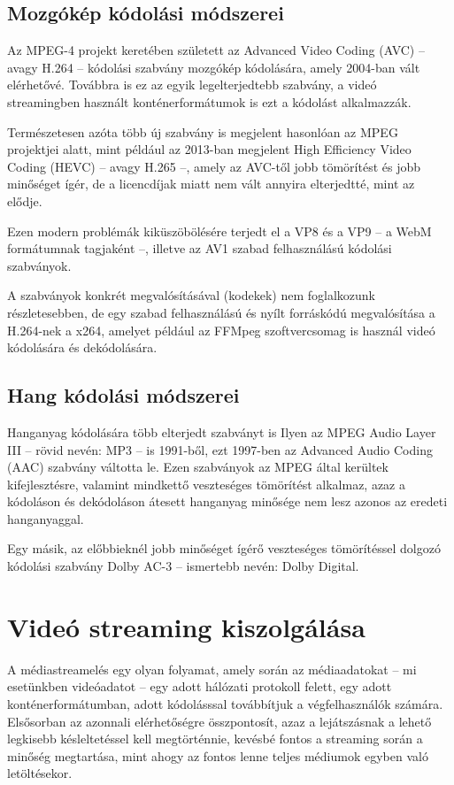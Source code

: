 \subsection{Mozgókép kódolási módszerei}

Az MPEG-4 projekt keretében született az Advanced Video Coding (AVC) -- avagy H.264 -- kódolási szabvány mozgókép kódolására, amely 2004-ban vált elérhetővé. Továbbra is ez az egyik legelterjedtebb szabvány, a videó streamingben használt konténerformátumok is ezt a kódolást alkalmazzák.

Természetesen azóta több új szabvány is megjelent hasonlóan az MPEG projektjei alatt, mint például az 2013-ban megjelent High Efficiency Video Coding (HEVC) -- avagy H.265 --, amely az AVC-től jobb tömörítést és jobb minőséget ígér, de a licencdíjak miatt nem vált annyira elterjedtté, mint az elődje.

Ezen modern problémák kiküszöbölésére terjedt el a VP8 és a VP9 -- a WebM formátumnak tagjaként --, illetve az AV1 szabad felhasználású kódolási szabványok.

A szabványok konkrét megvalósításával (kodekek) nem foglalkozunk részletesebben, de egy szabad felhasználású és nyílt forráskódú megvalósítása a H.264-nek a x264, amelyet például az FFMpeg szoftvercsomag is használ videó kódolására és dekódolására.

\subsection{Hang kódolási módszerei}

Hanganyag kódolására több elterjedt szabványt is Ilyen az MPEG Audio Layer III -- rövid nevén: MP3 -- is 1991-ből, ezt 1997-ben az Advanced Audio Coding (AAC) szabvány váltotta le. Ezen szabványok az MPEG által kerültek kifejlesztésre, valamint mindkettő veszteséges tömörítést alkalmaz, azaz a kódoláson és dekódoláson átesett hanganyag minősége nem lesz azonos az eredeti hanganyaggal.

Egy másik, az előbbieknél jobb minőséget ígérő veszteséges tömörítéssel dolgozó kódolási szabvány Dolby AC-3 -- ismertebb nevén: Dolby Digital.

\section{Videó streaming kiszolgálása}

A médiastreamelés egy olyan folyamat, amely során az médiaadatokat -- mi esetünkben videóadatot -- egy adott hálózati protokoll felett, egy adott konténerformátumban, adott kódolásssal továbbítjuk a végfelhasználók számára. Elsősorban az azonnali elérhetőségre összpontosít, azaz a lejátszásnak a lehető legkisebb késleltetéssel kell megtörténnie, kevésbé fontos a streaming során a minőség megtartása, mint ahogy az fontos lenne teljes médiumok egyben való letöltésekor.

